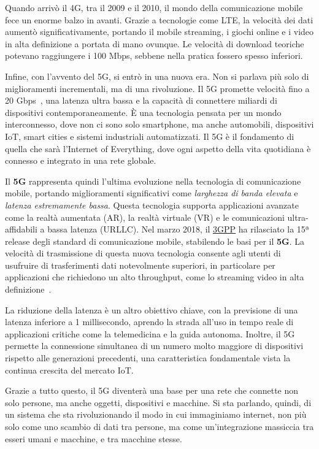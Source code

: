 \documentclass[english]{article}
\begin{document}
Quando arrivò il 4G, tra il 2009 e il 2010, il mondo della comunicazione mobile
fece un enorme balzo in avanti. Grazie a tecnologie come LTE, la velocità dei
dati aumentò significativamente, portando il mobile streaming, i giochi online
e i video in alta definizione a portata di mano ovunque. Le velocità di
download teoriche potevano raggiungere i 100 Mbps, sebbene nella pratica
fossero spesso inferiori.

Infine, con l'avvento del 5G, si entrò in una nuova era. Non si parlava più
solo di miglioramenti incrementali, ma di una rivoluzione. Il 5G promette
velocità fino a 20 Gbps~\cite{javid20225g}, una latenza ultra bassa e la
capacità di connettere miliardi di dispositivi contemporaneamente. È una
tecnologia pensata per un mondo interconnesso, dove non ci sono solo
smartphone, ma anche automobili, dispositivi IoT, smart cities e sistemi
industriali automatizzati. Il 5G è il fondamento di quella che sarà l'Internet
of Everything, dove ogni aspetto della vita quotidiana è connesso e integrato
in una rete globale.

Il \textbf{5G} rappresenta quindi l'ultima evoluzione nella tecnologia di
comunicazione mobile, portando miglioramenti significativi come
\textit{larghezza di banda elevata} e \textit{latenza estremamente bassa}.
Questa tecnologia supporta applicazioni avanzate come la realtà aumentata (AR),
la realtà virtuale (VR) e le comunicazioni ultra-affidabili a bassa latenza
(URLLC). Nel marzo 2018, il
\href{https://www.3gpp.org/technologies/5g-system-overview}{3GPP} ha rilasciato
la 15ª release degli standard di comunicazione mobile, stabilendo le basi per
il \textbf{5G}. La velocità di trasmissione di questa nuova tecnologia consente
agli utenti di usufruire di trasferimenti dati notevolmente superiori, in
particolare per applicazioni che richiedono un alto throughput, come lo
streaming video in alta definizione~\cite{javid20225g}.

La riduzione della latenza è un altro obiettivo chiave, con la previsione di
una latenza inferiore a 1 millisecondo, aprendo la strada all'uso in tempo
reale di applicazioni critiche come la telemedicina e la guida autonoma.
Inoltre, il 5G permette la connessione simultanea di un numero molto maggiore
di dispositivi rispetto alle generazioni precedenti, una caratteristica
fondamentale vista la continua crescita del mercato IoT.

Grazie a tutto questo, il 5G diventerà una base per una rete che connette non
solo persone, ma anche oggetti, dispositivi e macchine. Si sta parlando,
quindi, di un sistema che sta rivoluzionando il modo in cui immaginiamo
internet, non più solo come uno scambio di dati tra persone, ma come
un'integrazione massiccia tra esseri umani e macchine, e tra macchine stesse.
\end{document}
